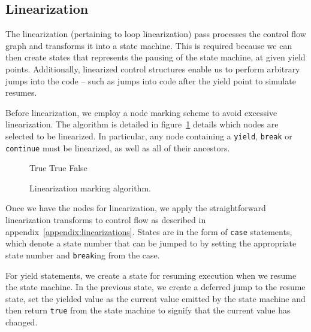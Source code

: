 \documentclass[journal,a4paper]{IEEEtran}
\begin{document}
\subsection{Linearization} \label{section:linearization}

The linearization (pertaining to loop linearization) pass processes the control flow graph and
transforms it into a state machine. This is required because we can then create states that
represents the pausing of the state machine, at given yield points. Additionally, linearized
control structures enable us to perform arbitrary jumps into the code -- such as jumps into code
after the yield point to simulate resumes.

Before linearization, we employ a node marking scheme to avoid excessive linearization. The
algorithm is detailed in figure~\ref{algorithm:mark-for-linearizing} details which nodes are
selected to be linearized. In particular, any node containing a \texttt{yield}, \texttt{break} or
\texttt{continue} must be linearized, as well as all of their ancestors.

\begin{figure}
\begin{algorithmic}
        \State {}
        \State \Return True
    \EndIf
            \State {}
        \EndIf
    \EndFor
        \State \Return True
    \Else
        \State \Return False
    \EndIf
\EndFunction\end{algorithmic}
\caption{Linearization marking algorithm.}
\label{algorithm:mark-for-linearizing}
\end{figure}

Once we have the nodes for linearization, we apply the straightforward linearization transforms to
control flow as described in appendix~\ref{appendix:linearizations}. States are in the form of
\texttt{case} statements, which denote a state number that can be jumped to by setting the
appropriate state number and \texttt{break}ing from the case.

For yield statements, we create a state for resuming execution when we resume the state machine. In
the previous state, we create a deferred jump to the resume state, set the yielded value as the
current value emitted by the state machine and then return \texttt{true} from the state machine to
signify that the current value has changed.
\end{document}
